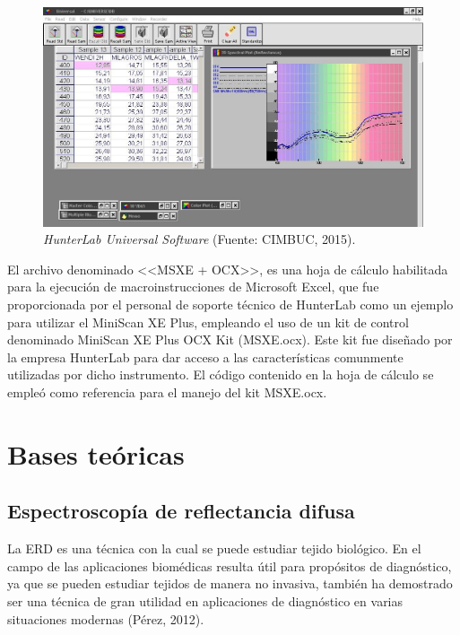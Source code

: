 	\begin{figure}[H]
		\centering
		\includegraphics[scale=0.5]{img/universal.jpg}
			\caption[HunterLab Universal Software]{\textit{HunterLab Universal Software} (Fuente: CIMBUC, 2015).}
	\end{figure}

			El archivo denominado <<MSXE + OCX>>, es una hoja de c\'{a}lculo habilitada para la ejecuci\'{o}n de macroinstrucciones de Microsoft Excel, que fue proporcionada por el personal de soporte t\'{e}cnico de HunterLab como un ejemplo para utilizar el MiniScan XE Plus, empleando el uso de un kit de control denominado MiniScan XE Plus OCX Kit (MSXE.ocx). Este kit fue dise\~{n}ado por la empresa HunterLab para dar acceso a las caracter\'{i}sticas comunmente utilizadas por dicho instrumento. El c\'{o}digo contenido en la hoja de c\'{a}lculo se emple\'{o} como referencia para el manejo del kit MSXE.ocx.

	\section{Bases te\'{o}ricas}
	
	\subsection{Espectroscop\'{i}a de reflectancia difusa}
	
		La ERD es una t\'{e}cnica con la cual se puede estudiar tejido biol\'{o}gico. En el campo de las aplicaciones biom\'{e}dicas resulta \'{u}til para prop\'{o}sitos de diagn\'{o}stico, ya que se pueden estudiar tejidos de manera no invasiva, tambi\'{e}n ha demostrado ser una t\'{e}cnica de gran utilidad en aplicaciones de diagn\'{o}stico en varias situaciones modernas (P\'{e}rez, 2012).
		
